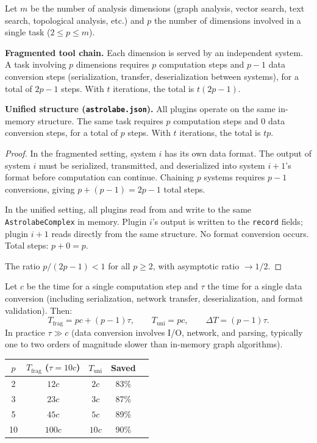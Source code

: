\begin{proposition}
\label{prop:pipeline}
Let $m$ be the number of analysis dimensions (graph analysis, vector search, text search, topological analysis, etc.) and $p$ the number of dimensions involved in a single task ($2 \leq p \leq m$).

\medskip
\noindent\textbf{Fragmented tool chain.} Each dimension is served by an independent system. A task involving $p$ dimensions requires $p$ computation steps and $p - 1$ data conversion steps (serialization, transfer, deserialization between systems), for a total of $2p - 1$ steps. With $t$ iterations, the total is $t(2p - 1)$.

\medskip
\noindent\textbf{Unified structure (\texttt{astrolabe.json}).} All plugins operate on the same in-memory structure. The same task requires $p$ computation steps and $0$ data conversion steps, for a total of $p$ steps. With $t$ iterations, the total is $tp$.
\end{proposition}

\begin{proof}
In the fragmented setting, system $i$ has its own data format. The output of system $i$ must be serialized, transmitted, and deserialized into system $i+1$'s format before computation can continue. Chaining $p$ systems requires $p - 1$ conversions, giving $p + (p-1) = 2p - 1$ total steps.

In the unified setting, all plugins read from and write to the same \texttt{AstrolabeComplex} in memory. Plugin $i$'s output is written to the \texttt{record} fields; plugin $i+1$ reads directly from the same structure. No format conversion occurs. Total steps: $p + 0 = p$.

The ratio $p / (2p - 1) < 1$ for all $p \geq 2$, with asymptotic ratio $\to 1/2$.
\end{proof}

\begin{corollary}
Let $c$ be the time for a single computation step and $\tau$ the time for a single data conversion (including serialization, network transfer, deserialization, and format validation). Then:
\[
T_{\mathrm{frag}} = pc + (p-1)\tau, \qquad T_{\mathrm{uni}} = pc, \qquad \Delta T = (p-1)\tau.
\]
In practice $\tau \gg c$ (data conversion involves I/O, network, and parsing, typically one to two orders of magnitude slower than in-memory graph algorithms).
\end{corollary}

\begin{center}
\begin{tabular}{ccccc}
$p$ & $T_{\mathrm{frag}}$ ($\tau = 10c$) & $T_{\mathrm{uni}}$ & Saved \\
\midrule
2 & $12c$ & $2c$ & 83\% \\
3 & $23c$ & $3c$ & 87\% \\
5 & $45c$ & $5c$ & 89\% \\
10 & $100c$ & $10c$ & 90\% \\
\end{tabular}
\end{center}

